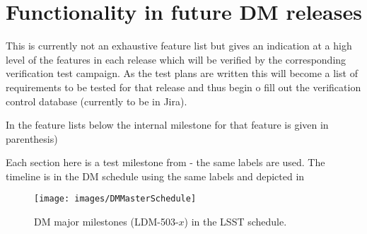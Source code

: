 \section{Functionality in future DM releases}

This is currently not an exhaustive feature list but gives an indication at a high level of the features in each release which will be verified by the corresponding verification test campaign.
As the test plans are written this will become a list of requirements to be tested for that release and thus begin o fill out the verification control database (currently to be in Jira).

In the feature lists below the internal milestone for that feature is given in parenthesis)


Each section here is a test milestone from  - the same labels are used. The timeline is in the DM schedule using the same labels and depicted in 

\begin{figure}[htbp]
        \begin{center}
                 \texttt{[image: images/DMMasterSchedule]}
                 \caption{DM major milestones (LDM-503-$x$) in the LSST schedule. \label{fig:schedule}}
         \end{center}
 \end{figure}
~


